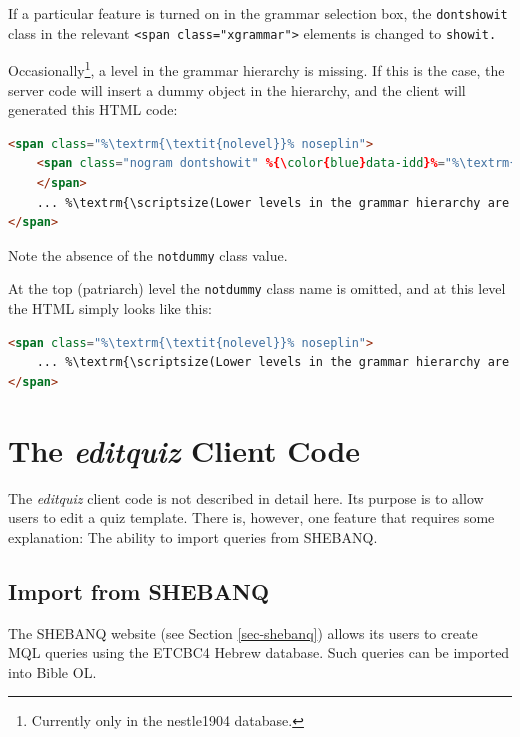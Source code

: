 \documentclass[11pt,oneside,a4paper]{memoir}
\newcommand*{\xml}[1]{\texttt{<#1>}}
\newcommand*{\xmla}[1]{\texttt{#1}} %
\begin{document}
If a particular feature is turned on in the grammar selection box, the
\xmla{dontshowit} class in the relevant \xml{span class="xgrammar"} elements is changed to
\xmla{showit.}


Occasionally\footnote{Currently only in the nestle1904 database.}, a level in the grammar hierarchy
is missing. If this is the case, the server code will insert a dummy object in
the hierarchy, and the client will generated this HTML code:

\begin{lstlisting}[language=HTML]
<span class="%\textrm{\textit{nolevel}}% noseplin">
    <span class="nogram dontshowit" %{\color{blue}data-idd}%="%\textrm{\textit{ID\_D}}%">%\textrm{\textit{loctype}}%
    </span>
    ... %\textrm{\scriptsize(Lower levels in the grammar hierarchy are inserted here)}%
</span>
\end{lstlisting}

Note the absence of the \xmla{notdummy} class value.


At the top (patriarch) level the \xmla{notdummy} class name is omitted, and at this
level the HTML simply looks like this:

\begin{lstlisting}[language=HTML]
<span class="%\textrm{\textit{nolevel}}% noseplin">
    ... %\textrm{\scriptsize(Lower levels in the grammar hierarchy are inserted here)}%
</span>
\end{lstlisting}

\section{The \emph{editquiz} Client Code}\label{sec-editquiz}

The \emph{editquiz} client code is not described in detail here. Its purpose is to allow users to
edit a quiz template. There is, however, one feature that requires some explanation: The ability to
import queries from SHEBANQ.

\subsection{Import from SHEBANQ}\label{sec-shebanq-import}

The SHEBANQ website (see Section \ref{sec-shebanq}) allows its users to create MQL queries using the
ETCBC4 Hebrew database. Such queries can be imported into Bible OL.
\end{document}
